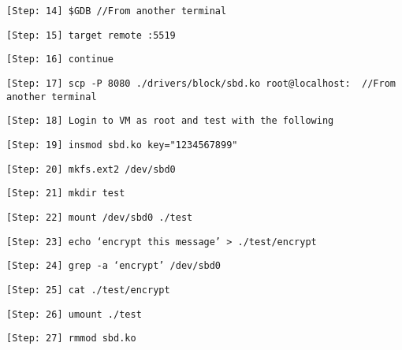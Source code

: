 \documentclass[10pt,letterpaper,draftclsnofoot,onecolumn]{IEEEtran}
\begin{document}
\begin{description}
\item \texttt{[Step: 14] \$GDB \newline //From another terminal}
\item \texttt{[Step: 15] target remote :5519}
\item \texttt{[Step: 16] continue}
\item \texttt{[Step: 17] scp -P 8080 ./drivers/block/sbd.ko root@localhost:~ \newline //From another terminal}
\item \texttt{[Step: 18] Login to VM as root and test with the following}
\item \texttt{[Step: 19] insmod sbd.ko key="1234567899"} 
\item \texttt{[Step: 20] mkfs.ext2 /dev/sbd0}
\item \texttt{[Step: 21] mkdir test}
\item \texttt{[Step: 22] mount /dev/sbd0 ./test}
\item \texttt{[Step: 23] echo ‘encrypt this message’ > ./test/encrypt}
\item \texttt{[Step: 24] grep -a ‘encrypt’ /dev/sbd0}
\item \texttt{[Step: 25] cat ./test/encrypt}
\item \texttt{[Step: 26] umount ./test}
\item \texttt{[Step: 27] rmmod sbd.ko}

\end{description}



\end{document}
